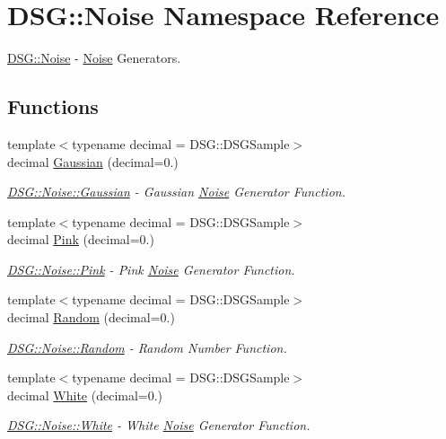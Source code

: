 \hypertarget{namespace_d_s_g_1_1_noise}{\section{D\+S\+G\+:\+:Noise Namespace Reference}
\label{namespace_d_s_g_1_1_noise}
}


\hyperlink{namespace_d_s_g_1_1_noise}{D\+S\+G\+::\+Noise} -\/ \hyperlink{namespace_d_s_g_1_1_noise}{Noise} Generators.  


\subsection*{Functions}
\begin{DoxyCompactItemize}
\item 
{\footnotesize template$<$typename decimal  = D\+S\+G\+::\+D\+S\+G\+Sample$>$ }\\decimal \hyperlink{namespace_d_s_g_1_1_noise_a87c4bcd92a902d32df1d7f1d5acffcd4}{Gaussian} (decimal=0.)
\begin{DoxyCompactList}\small\item\em \hyperlink{namespace_d_s_g_1_1_noise_a87c4bcd92a902d32df1d7f1d5acffcd4}{D\+S\+G\+::\+Noise\+::\+Gaussian} -\/ Gaussian \hyperlink{namespace_d_s_g_1_1_noise}{Noise} Generator Function. \end{DoxyCompactList}\item 
{\footnotesize template$<$typename decimal  = D\+S\+G\+::\+D\+S\+G\+Sample$>$ }\\decimal \hyperlink{namespace_d_s_g_1_1_noise_a9f0bab677a7602a8e0d40e040de8c8b2}{Pink} (decimal=0.)
\begin{DoxyCompactList}\small\item\em \hyperlink{namespace_d_s_g_1_1_noise_a9f0bab677a7602a8e0d40e040de8c8b2}{D\+S\+G\+::\+Noise\+::\+Pink} -\/ Pink \hyperlink{namespace_d_s_g_1_1_noise}{Noise} Generator Function. \end{DoxyCompactList}\item 
{\footnotesize template$<$typename decimal  = D\+S\+G\+::\+D\+S\+G\+Sample$>$ }\\decimal \hyperlink{namespace_d_s_g_1_1_noise_af210d83913fada9e9474410caff25bc1}{Random} (decimal=0.)
\begin{DoxyCompactList}\small\item\em \hyperlink{namespace_d_s_g_1_1_noise_af210d83913fada9e9474410caff25bc1}{D\+S\+G\+::\+Noise\+::\+Random} -\/ Random Number Function. \end{DoxyCompactList}\item 
{\footnotesize template$<$typename decimal  = D\+S\+G\+::\+D\+S\+G\+Sample$>$ }\\decimal \hyperlink{namespace_d_s_g_1_1_noise_a0d1c4b4522d2e56b1aa604e45ab92066}{White} (decimal=0.)
\begin{DoxyCompactList}\small\item\em \hyperlink{namespace_d_s_g_1_1_noise_a0d1c4b4522d2e56b1aa604e45ab92066}{D\+S\+G\+::\+Noise\+::\+White} -\/ White \hyperlink{namespace_d_s_g_1_1_noise}{Noise} Generator Function. \end{DoxyCompactList}\end{DoxyCompactItemize}


